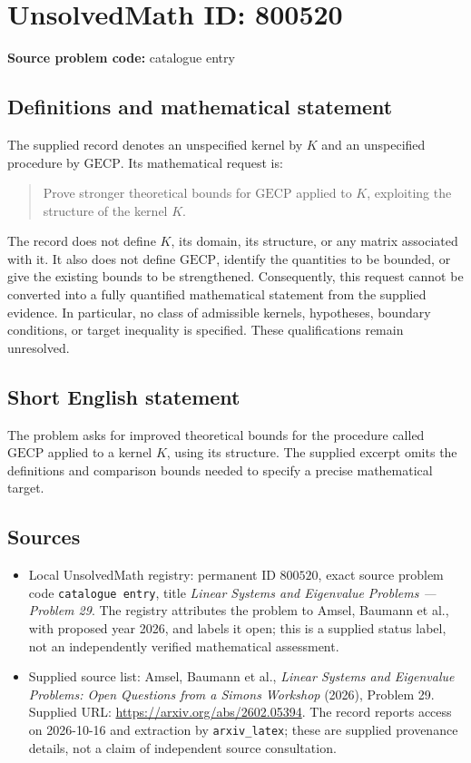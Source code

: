 \documentclass[11pt]{article}
\begin{document}
\section*{UnsolvedMath ID: 800520}
\textbf{Source problem code:} catalogue entry
\subsection{Definitions and mathematical statement}
The supplied record denotes an unspecified kernel by \(K\) and an unspecified procedure by \(\mathrm{GECP}\). Its mathematical request is:
\begin{quote}
Prove stronger theoretical bounds for \(\mathrm{GECP}\) applied to \(K\), exploiting the structure of the kernel \(K\).
\end{quote}
The record does not define \(K\), its domain, its structure, or any matrix associated with it. It also does not define \(\mathrm{GECP}\), identify the quantities to be bounded, or give the existing bounds to be strengthened. Consequently, this request cannot be converted into a fully quantified mathematical statement from the supplied evidence. In particular, no class of admissible kernels, hypotheses, boundary conditions, or target inequality is specified. These qualifications remain unresolved.
\subsection{Short English statement}
The problem asks for improved theoretical bounds for the procedure called \(\mathrm{GECP}\) applied to a kernel \(K\), using its structure. The supplied excerpt omits the definitions and comparison bounds needed to specify a precise mathematical target.
\subsection{Sources}
\begin{itemize}
\item Local UnsolvedMath registry: permanent ID \(800520\), exact source problem code \texttt{catalogue entry}, title \emph{Linear Systems and Eigenvalue Problems — Problem 29}. The registry attributes the problem to Amsel, Baumann et al., with proposed year 2026, and labels it open; this is a supplied status label, not an independently verified mathematical assessment.
\item Supplied source list: Amsel, Baumann et al., \emph{Linear Systems and Eigenvalue Problems: Open Questions from a Simons Workshop} (2026), Problem 29. Supplied URL: \url{https://arxiv.org/abs/2602.05394}. The record reports access on 2026-10-16 and extraction by \texttt{arxiv\_latex}; these are supplied provenance details, not a claim of independent source consultation.
\end{itemize}
\end{document}
